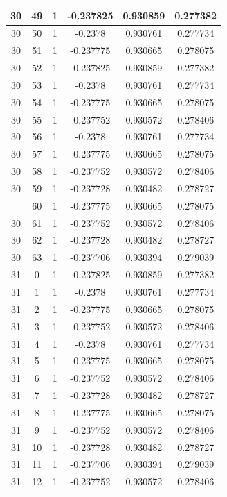 \documentclass[12pt,a4paper]{article}
\numberwithin{equation}{section}
\numberwithin{figure}{section}
\numberwithin{table}{section}
\begin{document}
\begin{longtable}{|c|c|c|c|c|c|}
30 & 49 & 1 & -0.237825 & 0.930859 & 0.277382 \\ \hline
30 & 50 & 1 & -0.2378 & 0.930761 & 0.277734 \\ \hline
30 & 51 & 1 & -0.237775 & 0.930665 & 0.278075 \\ \hline
30 & 52 & 1 & -0.237825 & 0.930859 & 0.277382 \\ \hline
30 & 53 & 1 & -0.2378 & 0.930761 & 0.277734 \\ \hline
30 & 54 & 1 & -0.237775 & 0.930665 & 0.278075 \\ \hline
30 & 55 & 1 & -0.237752 & 0.930572 & 0.278406 \\ \hline
30 & 56 & 1 & -0.2378 & 0.930761 & 0.277734 \\ \hline
30 & 57 & 1 & -0.237775 & 0.930665 & 0.278075 \\ \hline
30 & 58 & 1 & -0.237752 & 0.930572 & 0.278406 \\ \hline
30 & 59 & 1 & -0.237728 & 0.930482 & 0.278727 \\ \hline
\pagebreak
30 & 60 & 1 & -0.237775 & 0.930665 & 0.278075 \\ \hline
30 & 61 & 1 & -0.237752 & 0.930572 & 0.278406 \\ \hline
30 & 62 & 1 & -0.237728 & 0.930482 & 0.278727 \\ \hline
30 & 63 & 1 & -0.237706 & 0.930394 & 0.279039 \\ \hline
31 & 0 & 1 & -0.237825 & 0.930859 & 0.277382 \\ \hline
31 & 1 & 1 & -0.2378 & 0.930761 & 0.277734 \\ \hline
31 & 2 & 1 & -0.237775 & 0.930665 & 0.278075 \\ \hline
31 & 3 & 1 & -0.237752 & 0.930572 & 0.278406 \\ \hline
31 & 4 & 1 & -0.2378 & 0.930761 & 0.277734 \\ \hline
31 & 5 & 1 & -0.237775 & 0.930665 & 0.278075 \\ \hline
31 & 6 & 1 & -0.237752 & 0.930572 & 0.278406 \\ \hline
31 & 7 & 1 & -0.237728 & 0.930482 & 0.278727 \\ \hline
31 & 8 & 1 & -0.237775 & 0.930665 & 0.278075 \\ \hline
31 & 9 & 1 & -0.237752 & 0.930572 & 0.278406 \\ \hline
31 & 10 & 1 & -0.237728 & 0.930482 & 0.278727 \\ \hline
31 & 11 & 1 & -0.237706 & 0.930394 & 0.279039 \\ \hline
31 & 12 & 1 & -0.237752 & 0.930572 & 0.278406 \\ \hline

\end{longtable}
\end{document}
